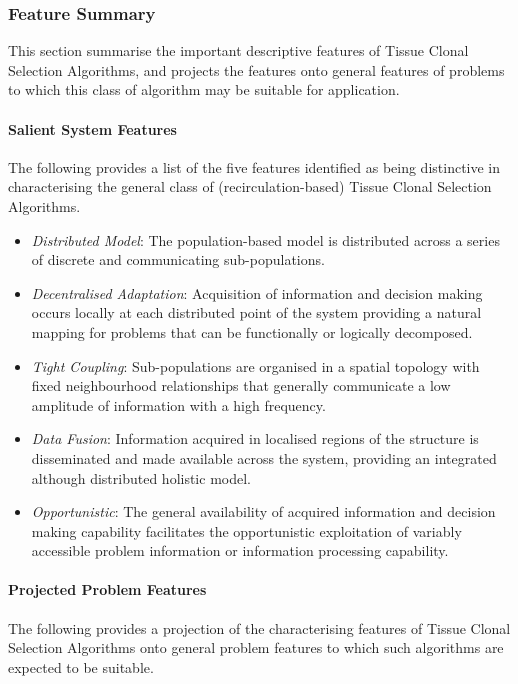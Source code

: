 %
%
\subsubsection{Feature Summary}
This section summarise the important descriptive features of Tissue Clonal Selection Algorithms, and projects the features onto general features of problems to which this class of algorithm may be suitable for application.

%
%
\paragraph{Salient System Features}
The following provides a list of the five features identified as being distinctive in characterising the general class of (recirculation-based) Tissue Clonal Selection Algorithms. 

\begin{itemize}
	\item \emph{Distributed Model}: The population-based model is distributed across a series of discrete and communicating sub-populations. 
	\item \emph{Decentralised Adaptation}: Acquisition of information and decision making occurs locally at each distributed point of the system providing a natural mapping for problems that can be functionally or logically decomposed.
	\item \emph{Tight Coupling}: Sub-populations are organised in a spatial topology with fixed neighbourhood relationships that generally communicate a low amplitude of information with a high frequency. 
	\item \emph{Data Fusion}: Information acquired in localised regions of the structure is disseminated and made available across the system, providing an integrated although distributed holistic model.
	\item \emph{Opportunistic}: The general availability of acquired information and decision making capability facilitates the opportunistic exploitation of variably accessible problem information or information processing capability.
\end{itemize}

%
%
\paragraph{Projected Problem Features}
The following provides a projection of the characterising features of Tissue Clonal Selection Algorithms onto general problem features to which such algorithms are expected to be suitable.

